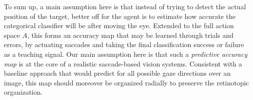 To sum up, a main assumption here is that instead of trying to detect the actual position of the target, better off for the agent is to estimate how accurate the categorical classifier will be after moving the eye. Extended to the full action space $A$, this forms an accuracy map that may be learned through trials and errors, by actuating saccades %
and taking the final classification success or failure as a teaching signal.
Our main assumption here is that such a \emph{predictive accuracy map} is at the core of a realistic saccade-based vision systems.
Consistent with a baseline approach that would predict for all possible gaze directions over an image, this map should moreover be organized radially to preserve the retinotopic organization.

